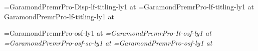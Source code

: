 \def\romantext{GaramondPremrPro-osf-ly1 }
\def\italictext{GaramondPremrPro-It-osf-ly1 }
\def\smallcaptext{GaramondPremrPro-osf-sc-ly1 }
\def\romantitlingtext{GaramondPremrPro-lf-titling-ly1 }
\def\romantitlingdisplay{GaramondPremrPro-Disp-lf-titling-ly1 }

\font\chaptertitlefont=\romantitlingdisplay at \aheadsize
\font\scenetitlefont=\romantitlingtext at \bheadsize
\font\authorinfotitlefont \romantitlingtext at \smalltextsize
\def\bookinfotitlefont{\scenetitlefont}

\font\rm=\romantext at \textsize
\font\it=\italictext at \textsize
\font\sc=\smallcaptext at \textsize
\font\fineprint=\romantext at \smalltextsize

%
%

\def\useemptypageframe{
  \global\headline={\line{}}
  \global\footline={\line{}}
  \global\@cleared@pagefalse
  \global\@display@pagefalse
}

\def\usedisplaypageframe{\@display@pagetrue\@cleared@pagefalse}

\def\usenormalpageframe{
  \global\headline={\runningheaderfont\normalpageheadline}
  \global\footline={\runningheaderfont\normalpagefootline}
  \global\@cleared@pagefalse
  \global\@display@pagefalse
}

\def\displaypagefootline{\runningheaderfont\hfil\folio\hfil}
\def\normalpageheadline{\ifodd\pageno\normaloddpageheadline\else\normalevenpageheadline\fi}
\def\normalpagefootline{\line{}}
\def\normaloddpageheadline{\title\hfil\folio}
\def\normalevenpageheadline{\folio\hfil\author}


%
%

\def\nextpage{\vfil\eject\global\@cleared@pagetrue\global\@display@pagefalse\relax}
\def\nextoddpage{\nextpage\ifodd\pageno \else \line{}\nextpage\fi}
\def\nextevenpage{\nextpage\ifodd\pageno \line{}\nextpage\else \fi}

\def\titlepage#1#2#3{
  \nextoddpage
  \useemptypageframe
  \baselinebox{\typesetbooktitle{#1}}{10}{0}
  \baselinebox{\typesetauthorname{#2}}{6}{6}
  \rightline{#3}
  \eject
}

\def\previewannouncementpage#1{
  \nextoddpage
  \line{}\vfill
  \centerline{\linelogo{20pt}}
  \vskip\baselineskip
  \centerline{\scenetitlefont proudly announces}
  \vfill
  {\usefont\booktitlefont\centered #1\par}
  \vskip\baselineskip
  \centerline{by}
  \vskip\baselineskip
  \centerline{\authornamefont\author}
  \vfill
  \centerline{Turn the page for a preview}
  \vfill
}
\def\previewpage#1{
  \nextoddpage
  \baselinebox{\typesetchapterheading{#1}}{10}{}
  \useemptypageframe
}

